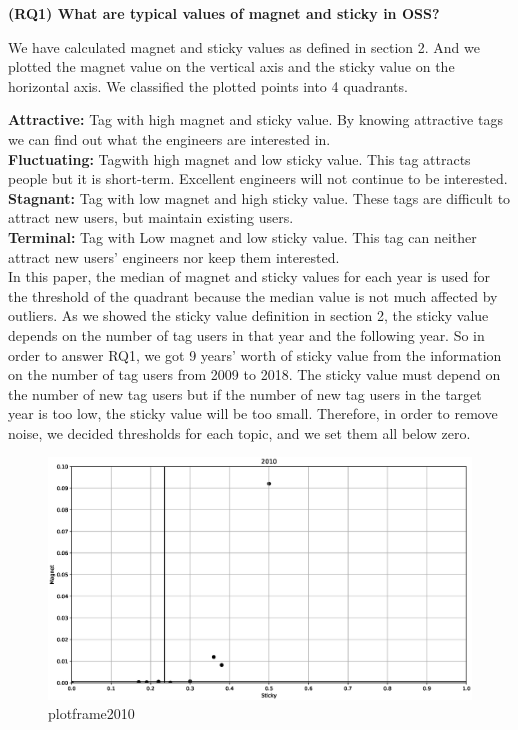 \documentclass[conference]{IEEEtran}
\begin{document}
\textbf{(RQ1) What are typical values of magnet and sticky in OSS?}

We have calculated magnet and sticky values as defined in section 2. And we plotted the magnet value on the vertical axis and the sticky value on the horizontal axis. We classified the plotted points into 4 quadrants.

\smallskip
\textbf{Attractive:} Tag with high magnet and sticky value. By knowing attractive tags we can find out what the engineers are interested in.\\
\textbf{Fluctuating:} Tagwith high magnet and low sticky value. This tag attracts people but it is short-term. Excellent engineers will not continue to be interested.\\
\textbf{Stagnant:} Tag with low magnet and high sticky value. These tags are difficult to attract new users, but maintain existing users.\\
\textbf{Terminal:} Tag with Low magnet and low sticky value. This tag can neither attract new users' engineers nor keep them interested.\\
\smallskip
In this paper, the median of magnet and sticky values for each year is used for the threshold of the quadrant because the median value is not much affected by outliers. As we showed the sticky value definition in section 2, the sticky value depends on the number of tag users in that year and the following year. So in order to answer RQ1, we got 9 years' worth of sticky value from the information on the number of tag users from 2009 to 2018. The sticky value must depend on the number of new tag users but if the number of new tag users in the target year is too low, the sticky value will be too small. Therefore, in order to remove noise, we decided thresholds for each topic, and we set them all below zero. 
\medskip

\begin{figure}[t]
 \centering
 \includegraphics[width=.9\hsize]{img/plot_frame_2010.eps}  
 \caption{plotframe2010} 
 \label{fig:plotframe2010} 
\end{figure}
\end{document}
